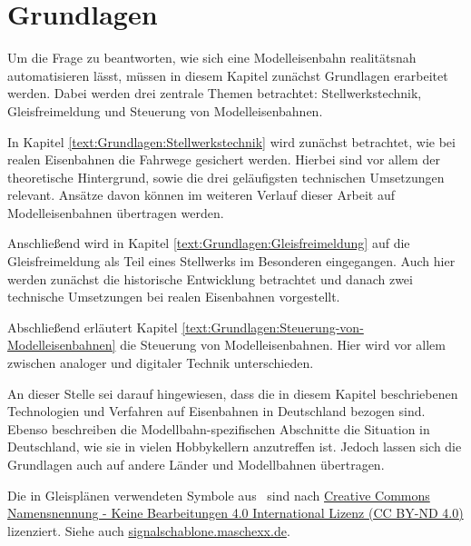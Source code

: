 \chapter{Grundlagen}\label{text:Grundlagen}

Um die Frage zu beantworten, wie sich eine Modelleisenbahn realitätsnah automatisieren lässt, müssen in diesem Kapitel zunächst Grundlagen erarbeitet werden. Dabei werden drei zentrale Themen betrachtet: Stellwerkstechnik, Gleisfreimeldung und Steuerung von Modelleisenbahnen.

In Kapitel \autoref{text:Grundlagen:Stellwerkstechnik}  wird zunächst betrachtet, wie bei realen Eisenbahnen die Fahrwege gesichert werden. Hierbei sind vor allem der theoretische Hintergrund, sowie die drei geläufigsten technischen Umsetzungen relevant. Ansätze davon können im weiteren Verlauf dieser Arbeit auf Modelleisenbahnen übertragen werden.

Anschließend wird in Kapitel \autoref{text:Grundlagen:Gleisfreimeldung}  auf die Gleisfreimeldung als Teil eines Stellwerks im Besonderen eingegangen. Auch hier werden zunächst die historische Entwicklung betrachtet und danach zwei technische Umsetzungen bei realen Eisenbahnen vorgestellt.

Abschließend erläutert Kapitel \autoref{text:Grundlagen:Steuerung-von-Modelleisenbahnen}  die Steuerung von Modelleisenbahnen. Hier wird vor allem zwischen analoger und digitaler Technik unterschieden.

An dieser Stelle sei darauf hingewiesen, dass die in diesem Kapitel beschriebenen Technologien und Verfahren auf Eisenbahnen in Deutschland bezogen sind. Ebenso beschreiben die Modellbahn-spezifischen Abschnitte die Situation in Deutschland, wie sie in vielen Hobbykellern anzutreffen ist. Jedoch lassen sich die Grundlagen auch auf andere Länder und Modellbahnen übertragen.

Die in Gleisplänen verwendeten Symbole aus~\cite{bib:Signalschablone} sind nach \href{https://creativecommons.org/licenses/by-nd/4.0/deed.de}{Creative Commons Namensnennung - Keine Bearbeitungen 4.0 International Lizenz (CC BY-ND 4.0)} lizenziert. Siehe auch \url{signalschablone.maschexx.de}.

\newpage


\newpage


\newpage

